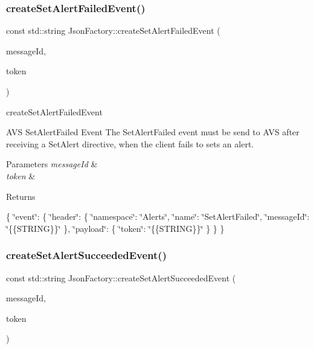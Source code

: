 \subsubsection{\texorpdfstring{create\+Set\+Alert\+Failed\+Event()}{createSetAlertFailedEvent()}}
{\footnotesize\ttfamily const std\+::string Json\+Factory\+::create\+Set\+Alert\+Failed\+Event (\begin{DoxyParamCaption}\item[{const std\+::string \&}]{message\+Id,  }\item[{const std\+::string \&}]{token }\end{DoxyParamCaption})}



create\+Set\+Alert\+Failed\+Event 

A\+VS Set\+Alert\+Failed Event The Set\+Alert\+Failed event must be send to A\+VS after receiving a Set\+Alert directive, when the client fails to sets an alert. 
\begin{DoxyParams}{Parameters}
{\em message\+Id} & \\
\hline
{\em token} & \\
\hline
\end{DoxyParams}
\begin{DoxyReturn}{Returns}

\end{DoxyReturn}
\{ \char`\"{}event\char`\"{}\+: \{ \char`\"{}header\char`\"{}\+: \{ \char`\"{}namespace\char`\"{}\+: \char`\"{}\+Alerts\char`\"{}, \char`\"{}name\char`\"{}\+: \char`\"{}\+Set\+Alert\+Failed\char`\"{}, \char`\"{}message\+Id\char`\"{}\+: \char`\"{}\{\{\+S\+T\+R\+I\+N\+G\}\}\char`\"{} \}, \char`\"{}payload\char`\"{}\+: \{ \char`\"{}token\char`\"{}\+: \char`\"{}\{\{\+S\+T\+R\+I\+N\+G\}\}\char`\"{} \} \} \} \mbox{\label{classAVSJson_1_1JsonFactory_a2ec0b23941d61705c3680d6017c1eb27}} 
\subsubsection{\texorpdfstring{create\+Set\+Alert\+Succeeded\+Event()}{createSetAlertSucceededEvent()}}
{\footnotesize\ttfamily const std\+::string Json\+Factory\+::create\+Set\+Alert\+Succeeded\+Event (\begin{DoxyParamCaption}\item[{const std\+::string \&}]{message\+Id,  }\item[{const std\+::string \&}]{token }\end{DoxyParamCaption})}



